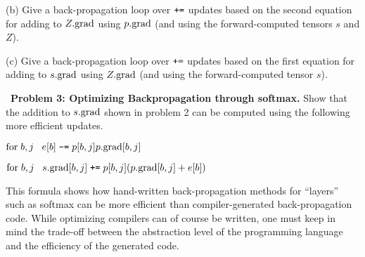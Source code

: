 \documentclass{article}
\newcommand{\solution}[1]{}
\begin{document}
\medskip
(b) Give a back-propagation loop over $\mbox{\tt +=}$ updates based on the second equation for adding to $Z.\mathrm{grad}$ using $p.\mathrm{grad}$
(and using the forward-computed tensors $s$ and $Z$).

\solution{
  \medskip
  For $b,j\;\;\;Z.\grad[b] \;\minuseq\; p.\grad[b,j]\exp(s[b,j])/Z[b]^2$}

\medskip
(c) Give a back-propagation loop over $\mbox{\tt +=}$ updates based on the first equation for adding to $s.\mathrm{grad}$ using $Z.\mathrm{grad}$
(and using the forward-computed tensor $s$).

\solution{
  \medskip
  For $b,j\;\;\;s.\grad[b,j] \;\pluseq\; Z.\grad[b]\exp(s[b,j])$}


\bigskip
~{\bf Problem 3:  Optimizing Backpropagation through softmax.} Show that the addition to $s.\mathrm{grad}$ shown in problem 2 can be computed using the following more efficient updates.

\medskip
$\mathrm{for}\;b,j\;\;\;e[b] \; \mbox{\tt -=} \; p[b,j]p.\mathrm{grad}[b,j]$

\medskip
$\mathrm{for}\;b,j\;\;\;s.\mathrm{grad}[b,j] \;\mbox{\tt +=} \; p[b,j](p.\mathrm{grad}[b,j] + e[b])$

\solution{
  The updates for problem 1 can be written as

  \medskip
  \begin{eqnarray*}
    \mathrm{for}\;b\;\;\;Z.\grad[b] & = & \sum_j \;-p.\grad[b,j]\exp(s[b,j])/Z[b]^2 \\
    & = & \left(\sum_j -p[b,j]p.\grad[b,j]\right)/Z[b] \\
    & = & e[b]/Z[b]
  \end{eqnarray*}

\begin{eqnarray*}
  \mathrm{for}\;b,j\;\;\;s.\grad[b,j] & = & p.\grad[b,j]\exp(s[b,j])/Z[b] + Z.\grad[b]\exp(s[b,j]) \\
  & = &  p.\grad[b,j]\left(\exp(s[b,j])/Z[b]\right) + e[b]\left(\exp(s[b,j])/Z[b]\right) \\
    & = &  p[b,j](p.\grad[b,j] +e[b])
\end{eqnarray*}

}
  
\medskip
This formula shows how hand-written back-propagation methods for ``layers'' such as softmax
can be more efficient than compiler-generated back-propagation code.
While optimizing compilers can of course be written, one must keep in mind the trade-off
between the abstraction level of the programming language and the efficiency of the generated code.
\end{document}
